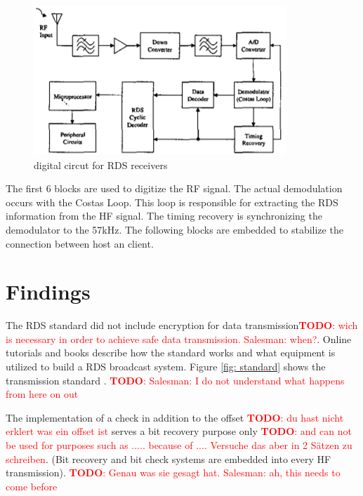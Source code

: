 \documentclass[conference,12pt,a4paper]{IEEEtran}
\newcommand{\todo}[1]{\textcolor{red}{\textbf{TODO}: #1}}
\begin{document}
	\begin{figure}[h]
		\centering
		\includegraphics[width = \linewidth]{img/circut}
		\caption{digital circut for RDS receivers}
		\label{fig: receiverCircut}
	\end{figure}

	The first 6 blocks are used to digitize the RF signal. The actual demodulation occurs with the Costas Loop. This loop is responsible for extracting the RDS information from the HF signal. The timing recovery is synchronizing the demodulator to the 57kHz. The following blocks are embedded to stabilize the connection between host an client.    



	
	\section{Findings}
	
	The RDS standard did not include encryption for data transmission\todo{wich is necessary in order to achieve safe data transmission. Salesman: when?}. Online tutorials and books describe how the standard works and what equipment is utilized to build a RDS broadcast system. Figure \ref{fig: standard} shows the transmission standard \cite{DIN_EN}. \todo{Salesman: I do not understand what happens from here on out }
	
	
	The implementation of a check in addition to the offset \todo{du hast nicht erklert was ein offset ist} serves a bit recovery purpose only \todo{and can not be used for purposes such as ..... because of .... Versuche das aber in 2 Sätzen zu schreiben}. (Bit recovery and bit check systems are embedded into every HF transmission). \todo{Genau was sie gesagt hat. Salesman: ah, this needs to come before}
	
\end{document}
